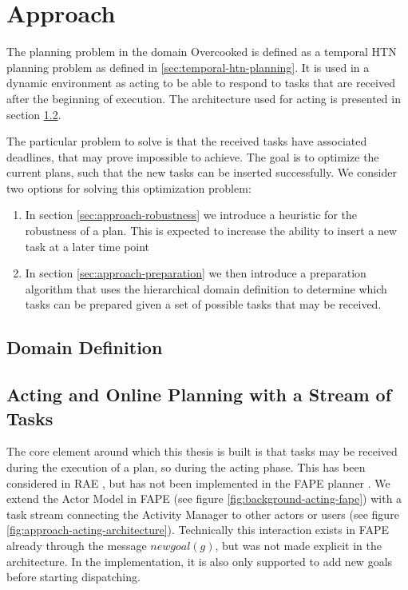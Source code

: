 \section{Approach}\label{sec:approach}


The planning problem in the domain Overcooked is defined as a temporal HTN planning problem as defined in \ref{sec:temporal-htn-planning}.
It is used in a dynamic environment as acting to be able to respond to tasks that are received after the beginning of execution.
The architecture used for acting is presented in section \ref{sec:approach-acting}.

The particular problem to solve is that the received tasks have associated deadlines, that may prove impossible to achieve.
The goal is to optimize the current plans, such that the new tasks can be inserted successfully.
We consider two options for solving this optimization problem:

\begin{enumerate}
    \item In section \ref{sec:approach-robustness} we introduce a heuristic for the robustness of a plan. This is expected to increase the ability to insert a new task at a later time point
    \item In section \ref{sec:approach-preparation} we then introduce a preparation algorithm that uses the hierarchical domain definition to determine which tasks can be prepared given a set of possible tasks that may be received.
\end{enumerate}

\subsection{Domain Definition}
\label{sec:approach-domain}

\subsection{Acting and Online Planning with a Stream of Tasks}
\label{sec:approach-acting}

The core element around which this thesis is built is that tasks may be received during the execution of a plan, so during the acting phase.
This has been considered in RAE \citep{ghallabAutomatedPlanningActing2016}, but has not been implemented in the FAPE planner \citep{bit-monnotTemporalHierarchicalModels2016a}.
We extend the Actor Model in FAPE (see figure \ref{fig:background-acting-fape}) with a task stream connecting the Activity Manager to other actors or users (see figure \ref{fig:approach-acting-architecture}).
Technically this interaction exists in FAPE already through the message $newgoal(g)$, but was not made explicit in the architecture.
In the implementation, it is also only supported to add new goals before starting dispatching.

